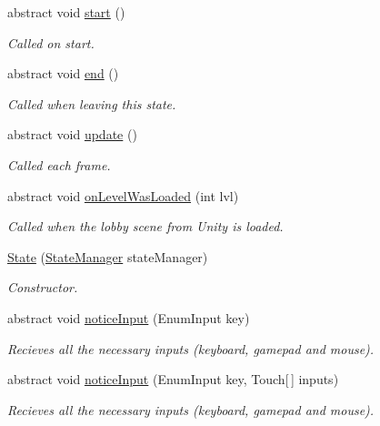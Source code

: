 \begin{DoxyCompactItemize}
\item 
abstract void \hyperlink{class_state_ad68a2a8c10c96ef3a1c7d4bd07468fbf}{start} ()
\begin{DoxyCompactList}\small\item\em Called on start.\end{DoxyCompactList}\item 
abstract void \hyperlink{class_state_a49c5d76957d7d737c345cb8b563d318b}{end} ()
\begin{DoxyCompactList}\small\item\em Called when leaving this state.\end{DoxyCompactList}\item 
abstract void \hyperlink{class_state_a953d2122c47b590fd72a4be8a98124f9}{update} ()
\begin{DoxyCompactList}\small\item\em Called each frame.\end{DoxyCompactList}\item 
abstract void \hyperlink{class_state_a93317fb33262a8ded9f91b8d0cf472db}{on\-Level\-Was\-Loaded} (int lvl)
\begin{DoxyCompactList}\small\item\em Called when the lobby scene from Unity is loaded.\end{DoxyCompactList}\item 
\hyperlink{class_state_a9bd2264300507466600b8ed0105741b6}{State} (\hyperlink{class_state_manager}{State\-Manager} state\-Manager)
\begin{DoxyCompactList}\small\item\em Constructor.\end{DoxyCompactList}\item 
abstract void \hyperlink{class_state_ae5137278ec92501b5623c8f4d8f1c784}{notice\-Input} (Enum\-Input key)
\begin{DoxyCompactList}\small\item\em Recieves all the necessary inputs (keyboard, gamepad and mouse).\end{DoxyCompactList}\item 
abstract void \hyperlink{class_state_aaff2d4ba964e7b6d5277067ac63419c8}{notice\-Input} (Enum\-Input key, Touch\mbox{[}$\,$\mbox{]} inputs)
\begin{DoxyCompactList}\small\item\em Recieves all the necessary inputs (keyboard, gamepad and mouse).\end{DoxyCompactList}\end{DoxyCompactItemize}
